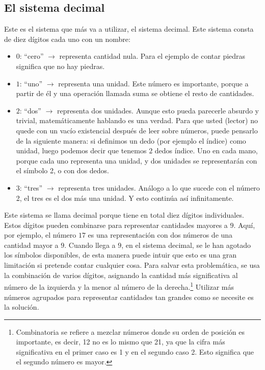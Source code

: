 \subsection{El sistema decimal}

Este es el sistema que más va a utilizar, el sistema decimal. Este sistema consta de diez dígitos cada uno con un nombre:
\begin{itemize}
  \item \(0\): ``cero'' \(\rightarrow\) representa cantidad nula. Para el ejemplo de contar piedras significa que no hay piedras.
  \item \(1\): ``uno'' \(\rightarrow\) representa una unidad. Este número es importante, porque a partir de él y una operación llamada suma se obtiene el resto de cantidades.
  \item \(2\): ``dos'' \(\rightarrow\) representa dos unidades. Aunque esto pueda parecerle absurdo y trivial, matemáticamente hablando es una verdad. Para que usted (lector) no quede con un vacío existencial después de leer sobre números, puede pensarlo de la siguiente manera: si definimos un dedo (por ejemplo el índice) como unidad, luego podemos decir que tenemos \(2\) dedos índice. Uno en cada mano, porque cada uno representa una unidad, y dos unidades se representarán con el símbolo 2, o con dos dedos.
  \item \(3\): ``tres'' \(\rightarrow\) representa tres unidades. Análogo a lo que sucede con el número 2, el tres es el dos más una unidad. Y esto continúa así infinitamente.
\end{itemize}
Este sistema se llama decimal porque tiene en total diez dígitos individuales. Estos dígitos pueden combinarse para representar cantidades mayores a \(9\). Aquí, por ejemplo, el número \(17\) es una representación con dos números de una cantidad mayor a \(9\). Cuando llega a \(9\), en el sistema decimal, se le han agotado los símbolos disponibles, de esta manera puede intuir que esto es una gran limitación si pretende contar cualquier cosa. Para salvar esta problemática, se usa la combinación de varios dígitos, asignando la cantidad más significativa al número de la izquierda y la menor al número de la derecha.\footnote{Combinatoria se refiere a mezclar números donde su orden de posición es importante, es decir, 12 no es lo mismo que 21, ya que la cifra más significativa en el primer caso es 1 y en el segundo caso 2. Esto significa que el segundo número es mayor.} Utilizar más números agrupados para representar cantidades tan grandes como se necesite es la solución.


